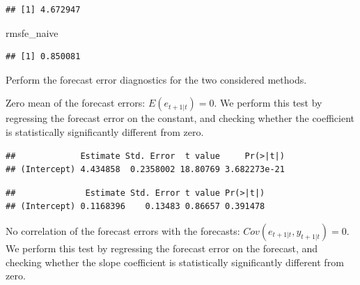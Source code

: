 \documentclass[
  12pt,
  oneside]{book}
\newenvironment{Shaded}{\begin{snugshade}}{\end{snugshade}}
\newcommand{\AttributeTok}[1]{\textcolor[rgb]{0.77,0.63,0.00}{#1}}
\newcommand{\DecValTok}[1]{\textcolor[rgb]{0.00,0.00,0.81}{#1}}
\newcommand{\FunctionTok}[1]{\textcolor[rgb]{0.00,0.00,0.00}{#1}}
\newcommand{\NormalTok}[1]{#1}
\newcommand{\SpecialCharTok}[1]{\textcolor[rgb]{0.00,0.00,0.00}{#1}}
\begin{document}
\begin{verbatim}
## [1] 4.672947
\end{verbatim}

\begin{Shaded}
\begin{Highlighting}[]
\NormalTok{rmsfe\_naive}
\end{Highlighting}
\end{Shaded}

\begin{verbatim}
## [1] 0.850081
\end{verbatim}

Perform the forecast error diagnostics for the two considered methods.

Zero mean of the forecast errors: \(E(e_{t+1|t})=0\).
We perform this test by regressing the forecast error on the constant, and checking whether the coefficient is statistically significantly different from zero.

\begin{Shaded}
\end{Shaded}

\begin{verbatim}
##             Estimate Std. Error  t value     Pr(>|t|)
## (Intercept) 4.434858  0.2358002 18.80769 3.682273e-21
\end{verbatim}

\begin{Shaded}
\end{Shaded}

\begin{verbatim}
##              Estimate Std. Error t value Pr(>|t|)
## (Intercept) 0.1168396    0.13483 0.86657 0.391478
\end{verbatim}

No correlation of the forecast errors with the forecasts: \(Cov(e_{t+1|t},y_{t+1|t})=0\). We perform this test by regressing the forecast error on the forecast, and checking whether the slope coefficient is statistically significantly different from zero.
\end{document}
